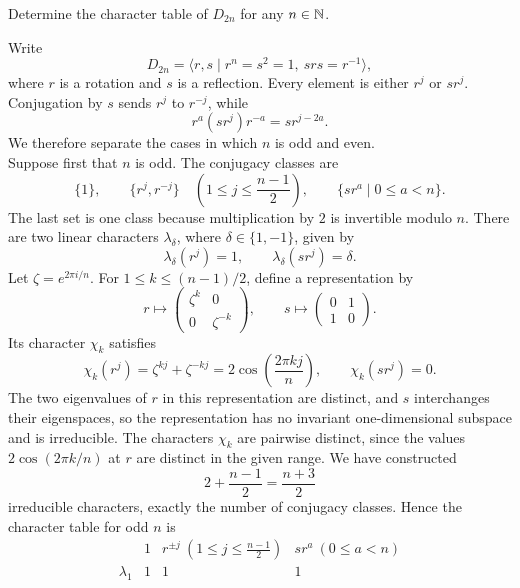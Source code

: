 \documentclass[../Odyssey_Project.tex]{subfiles}
\begin{document}
\begin{exercise}
\label{ex:15.9}
Determine the character table of $D_{2n}$ for any $n \in \mathbb{N}$.
\end{exercise}
\begin{solution}
    Write
    \[
        D_{2n}=\langle r,s\mid r^n=s^2=1,\ srs=r^{-1}\rangle,
    \]
    where $r$ is a rotation and $s$ is a reflection. Every element is either $r^j$ or $sr^j$. Conjugation by $s$ sends $r^j$ to $r^{-j}$, while
    \[
        r^a(sr^j)r^{-a}=sr^{j-2a}.
    \]
    We therefore separate the cases in which $n$ is odd and even.\\
    Suppose first that $n$ is odd. The conjugacy classes are
    \[
        \{1\},
        \qquad
        \{r^j,r^{-j}\}\quad\left(1\leq j\leq\frac{n-1}{2}\right),
        \qquad
        \{sr^a\mid0\leq a<n\}.
    \]
    The last set is one class because multiplication by $2$ is invertible modulo $n$. There are two linear characters $\lambda_{\delta}$, where $\delta\in\{1,-1\}$, given by
    \[
        \lambda_{\delta}(r^j)=1,
        \qquad
        \lambda_{\delta}(sr^j)=\delta.
    \]
    Let $\zeta=e^{2\pi i/n}$. For $1\leq k\leq(n-1)/2$, define a representation by
    \[
        r\longmapsto
        \begin{pmatrix}
            \zeta^k&0\\
            0&\zeta^{-k}
        \end{pmatrix},
        \qquad
        s\longmapsto
        \begin{pmatrix}
            0&1\\
            1&0
        \end{pmatrix}.
    \]
    Its character $\chi_k$ satisfies
    \[
        \chi_k(r^j)=\zeta^{kj}+\zeta^{-kj}=2\cos\left(\frac{2\pi kj}{n}\right),
        \qquad
        \chi_k(sr^j)=0.
    \]
    The two eigenvalues of $r$ in this representation are distinct, and $s$ interchanges their eigenspaces, so the representation has no invariant one-dimensional subspace and is irreducible. The characters $\chi_k$ are pairwise distinct, since the values $2\cos(2\pi k/n)$ at $r$ are distinct in the given range. We have constructed
    \[
        2+\frac{n-1}{2}=\frac{n+3}{2}
    \]
    irreducible characters, exactly the number of conjugacy classes. Hence the character table for odd $n$ is
    \[
        \begin{array}{c|ccc}
            &1&r^{\pm j}\ \left(1\leq j\leq\frac{n-1}{2}\right)&sr^a\ (0\leq a<n)\\
            \hline
            \lambda_{1}&1&1&1\\

\end{array}\]
\end{solution}
\end{document}
